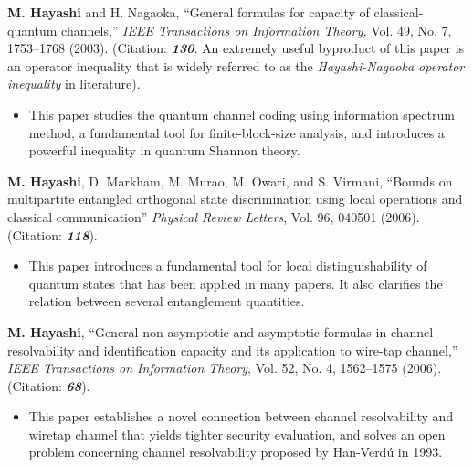 \begin{thebibliography}{99}
\begin{itemize}
\end{itemize}
\vspace{3 mm}




 \textbf{M. Hayashi} and H. Nagaoka, 
``General formulas for capacity of classical-quantum channels,'' 
{\em IEEE Transactions on Information Theory,}
Vol. 49, No. 7, 1753--1768 (2003). 
(Citation: \textbf{\textit{130}}. An extremely useful byproduct of this paper is an operator inequality that is widely referred to as the \textit{Hayashi-Nagaoka operator inequality} in literature).

\begin{itemize}
\item This paper studies the quantum channel coding using information spectrum method, a fundamental tool for finite-block-size analysis, and introduces a powerful inequality in quantum Shannon theory.

\end{itemize}
\vspace{3 mm}


 \textbf{M. Hayashi}, D. Markham, M. Murao, M. Owari, and S. Virmani, 
``Bounds on multipartite entangled orthogonal state discrimination using local
operations and classical communication'' 
{\em Physical Review Letters}, Vol. 96, 040501 (2006). 
(Citation: \textbf{\textit{118}}).

\begin{itemize}
\item This paper introduces a fundamental tool for local distinguishability of quantum states that has been applied in many papers.
It also clarifies the relation between several entanglement quantities.

\end{itemize}
\vspace{3 mm}





 \textbf{M. Hayashi}, 
``General non-asymptotic and asymptotic formulas in
channel resolvability and identification capacity and its application to wire-tap channel,'' 
{\em IEEE Transactions on Information Theory}, Vol. 52, No. 4, 1562--1575 (2006). 
(Citation: \textbf{\textit{68}}).
 
\begin{itemize}
\item This paper establishes a novel connection between channel resolvability and wiretap channel 
that yields tighter security evaluation, and solves an open problem concerning channel resolvability proposed by Han-Verd\'{u} in 1993.


\end{itemize}
\end{thebibliography}
